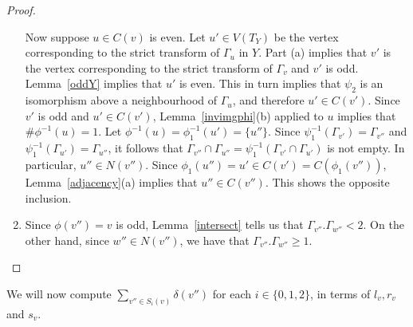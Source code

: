 \begin{proof}
\begin{enumerate}[\upshape (a)]
  Now suppose $u \in C(v)$ is even. Let $u' \in V(T_Y)$ be the vertex corresponding to the strict transform of $\Gamma_u$ in $Y$. Part (a) implies that $v'$ is the vertex corresponding to the strict transform of $\Gamma_v$ and $v'$ is odd. Lemma~\ref{oddY} implies that $u'$ is even. This in turn implies that $\psi_2$ is an isomorphism above a neighbourhood of $\Gamma_{u}$, and therefore $u' \in C(v')$. Since $v'$ is odd and $u' \in C(v')$, Lemma~\ref{invimgphi}(b) applied to $u$ implies that $\# \phi^{-1}(u) = 1$. Let $\phi^{-1}(u) = \phi_1^{-1}(u') = \{ u'' \}$. Since $\psi_1^{-1}(\Gamma_{v'}) = \Gamma_{v''}$ and $\psi_1^{-1}(\Gamma_{u'}) = \Gamma_{u''}$, it follows that $\Gamma_{v''} \cap \Gamma_{u''} = \psi_1^{-1}(\Gamma_{v'} \cap \Gamma_{u'})$ is not empty. In particular,  $u'' \in N(v'')$. Since $\phi_1(u'') = u' \in C(v') = C(\phi_1(v''))$, Lemma~\ref{adjacency}(a) implies that $u'' \in C(v'')$. This shows the opposite inclusion.
  
  \item Since $\phi(v'') = v$ is odd, Lemma~\ref{intersect} tells us that $ \Gamma_{v''}.\Gamma_{w''} < 2$. On the other hand, since $w'' \in N(v'')$, we have that $\Gamma_{v''}.\Gamma_{w''} \geq 1$. \qedhere
 \end{enumerate}
\end{proof}

We will now compute $\sum_{v'' \in S_i(v)} \delta(v'')$ for each $i \in \{0,1,2\}$, in terms of $l_v,r_v$ and $s_v$.

